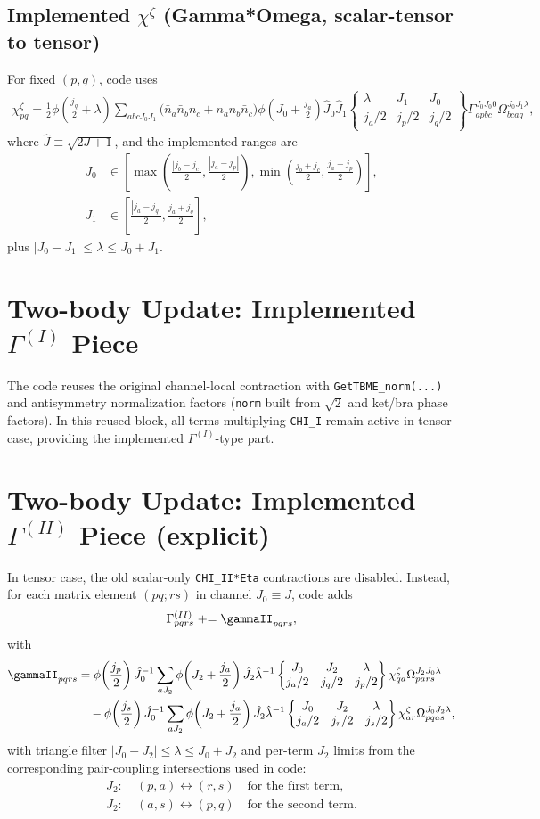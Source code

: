 \documentclass{article}
\newcommand{\sixj}[6]{\left\{\begin{matrix}#1&#2&#3\\#4&#5&#6\end{matrix}\right\}}
\begin{document}
\subsection*{Implemented $\chi^{\zeta}$ (Gamma*Omega, scalar-tensor to tensor)}
For fixed $(p,q)$, code uses
\begin{align}
\chi^{\zeta}_{pq}
=\frac{1}{2}\phi\!\left(\frac{j_q}{2}+\lambda\right)
\sum_{abcJ_0J_1}
\Big(\bar n_a\bar n_b n_c + n_a n_b\bar n_c\Big)
\phi\!\left(J_0+\frac{j_a}{2}\right)
\hat J_0\hat J_1
\sixj{\lambda}{J_1}{J_0}{j_a/2}{j_p/2}{j_q/2}
\Gamma_{apbc}^{J_0J_0 0}
\Omega_{bcaq}^{J_0J_1\lambda},
\end{align}
where $\hat J\equiv\sqrt{2J+1}$,
and the implemented ranges are
\begin{align}
J_0 &\in
\left[
\max\!\left(\frac{|j_b-j_c|}{2},\frac{|j_a-j_p|}{2}\right),
\min\!\left(\frac{j_b+j_c}{2},\frac{j_a+j_p}{2}\right)
\right],
\\
J_1 &\in
\left[
\frac{|j_a-j_q|}{2},\frac{j_a+j_q}{2}
\right],
\end{align}
plus $|J_0-J_1|\le\lambda\le J_0+J_1$.

\section*{Two-body Update: Implemented $\Gamma^{(I)}$ Piece}
The code reuses the original channel-local contraction with
\texttt{GetTBME\_norm(...)} and antisymmetry normalization factors
(\texttt{norm} built from $\sqrt{2}$ and ket/bra phase factors).
In this reused block, all terms multiplying \texttt{CHI\_I}
remain active in tensor case, providing the implemented $\Gamma^{(I)}$-type part.

\section*{Two-body Update: Implemented $\Gamma^{(II)}$ Piece (explicit)}
In tensor case, the old scalar-only \texttt{CHI\_II*Eta} contractions are disabled.
Instead, for each matrix element $(pq;rs)$ in channel $J_0\equiv J$, code adds
\begin{align}
\Gamma^{(II)}_{pqrs} \mathrel{+}= \gammaII_{pqrs},
\end{align}
with
\begin{align}
\gammaII_{pqrs}
&=
\phi\!\left(\frac{j_p}{2}\right)\hat J_0^{-1}
\sum_{aJ_2}
\phi\!\left(J_2+\frac{j_a}{2}\right)
\hat J_2\hat\lambda^{-1}
\sixj{J_0}{J_2}{\lambda}{j_a/2}{j_q/2}{j_p/2}
\chi^{\zeta}_{qa}
\Omega_{pars}^{J_2J_0\lambda}
\\
&\quad-
\phi\!\left(\frac{j_s}{2}\right)\hat J_0^{-1}
\sum_{aJ_2}
\phi\!\left(J_2+\frac{j_a}{2}\right)
\hat J_2\hat\lambda^{-1}
\sixj{J_0}{J_2}{\lambda}{j_a/2}{j_r/2}{j_s/2}
\chi^{\zeta}_{ar}
\Omega_{pqas}^{J_0J_2\lambda},
\end{align}
with triangle filter $|J_0-J_2|\le\lambda\le J_0+J_2$ and per-term
$J_2$ limits from the corresponding pair-coupling intersections used in code:
\begin{align}
J_2:&\ (p,a)\leftrightarrow(r,s) \quad\text{for the first term},
\\
J_2:&\ (a,s)\leftrightarrow(p,q) \quad\text{for the second term}.
\end{align}
\end{document}
